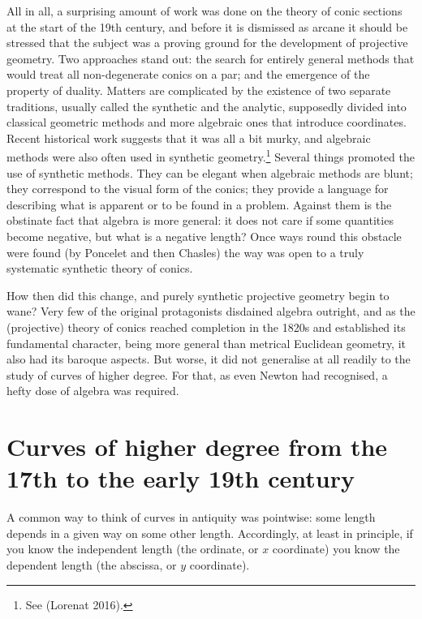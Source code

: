 All in all, a surprising amount of work was done on the theory of conic sections  at the start of the 19th century, and before it is dismissed as arcane it should be stressed that the subject was a proving ground for the development of projective geometry. Two approaches stand out: the search for entirely  general methods that would treat all non-degenerate conics on a par; and the emergence of the property of duality. Matters are complicated by the existence of two separate traditions, usually called the synthetic and the analytic, supposedly divided into classical geometric methods and more algebraic ones that introduce coordinates. 
Recent historical work suggests that it was all a bit murky, and algebraic methods were also often used in synthetic geometry.\footnote{See (Lorenat 2016).} Several things promoted the use of synthetic methods. They can be elegant when algebraic methods are blunt; they correspond to the visual form of the conics; they provide a language for describing what is apparent or to be found in a problem. Against them is the obstinate fact that algebra is more general: it does not care if some quantities become negative, but what is a negative length? Once ways round this obstacle were found (by Poncelet and then Chasles) the way was open to a truly systematic synthetic theory of conics.   

How then did this change, and purely synthetic projective geometry begin to wane? Very few of the original protagonists disdained algebra outright, and as the (projective) theory of conics reached completion in the 1820s and established its fundamental character, being more general than metrical Euclidean geometry, it also had its baroque aspects. But worse, it did not generalise at all readily  to the study of curves of higher degree. For that, as even Newton had recognised, a hefty dose of algebra was required.







\section{Curves of higher degree from the 17th to the early 19th century} A common way to think of curves in antiquity was pointwise: some length depends in a given way on some other length. Accordingly, at least in principle, if you know the independent length
(the ordinate, or $x$ coordinate) you know the dependent length (the abscissa, or $y$ coordinate).  

